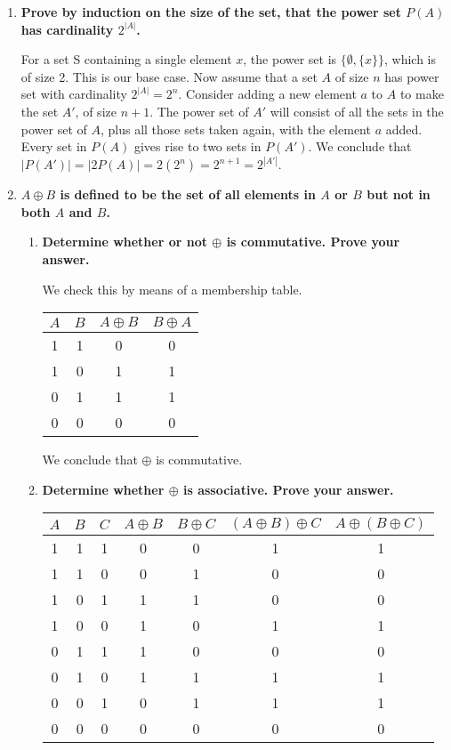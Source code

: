 \documentclass[12pt]{amsart}
\begin{document}
\begin{enumerate}
\medskip

\item {\bf Prove by induction on the size of the set, that the power set $P(A)$ has cardinality $2^{|A|}$.}

For a set S containing a single element $x$, the power set is
$\{\emptyset, \{x\}\}$, which is of size 2.  This is our base case.
Now assume that a set $A$ of size $n$ has power set with cardinality
$2^{|A|} = 2^n$.  Consider adding a new element $a$ to $A$ to make the
set $A'$, of size $n+1$.  The power set of $A'$ will consist of all
the sets in the power set of $A$, plus all those sets taken again,
with the element $a$ added.  Every set in $P(A)$ gives rise to two
sets in $P(A')$.  We conclude that $|P(A')| = |2P(A)| = 2(2^n) =
2^{n+1} = 2^{|A'|}$.

\medskip

\item {\bf $A \oplus B$ is defined to be the set of all elements in $A$ or $B$ but not in both $A$ and $B$.}
\begin{enumerate}
\item {\bf Determine whether or not $\oplus$ is commutative.  Prove your answer.}

We check this by means of a membership table.

\begin{tabular}{|c|c|c|c|}
\hline
$A$ & $B$ & $A \oplus B$ & $B \oplus A$ \\
\hline
1 & 1 & 0 & 0 \\
1 & 0 & 1 & 1 \\
0 & 1 & 1 & 1 \\
0 & 0 & 0 & 0 \\
\hline
\end{tabular}

We conclude that $\oplus$ is commutative.

\item {\bf Determine whether $\oplus$ is associative.  Prove your answer.}

\begin{tabular}{|c|c|c|c|c|c|c|}
\hline
$A$ & $B$ & $C$ & $A \oplus B$ & $B \oplus C$ & $(A \oplus B) \oplus C$ & $A \oplus (B \oplus C) $ \\
\hline
1 & 1 & 1 & 0 & 0 & 1 & 1 \\
1 & 1 & 0 & 0 & 1 & 0 & 0 \\
1 & 0 & 1 & 1 & 1 & 0 & 0 \\
1 & 0 & 0 & 1 & 0 & 1 & 1 \\
0 & 1 & 1 & 1 & 0 & 0 & 0 \\
0 & 1 & 0 & 1 & 1 & 1 & 1 \\
0 & 0 & 1 & 0 & 1 & 1 & 1 \\
0 & 0 & 0 & 0 & 0 & 0 & 0 \\
\hline
\end{tabular}


\end{enumerate}
\end{enumerate}
\end{document}

